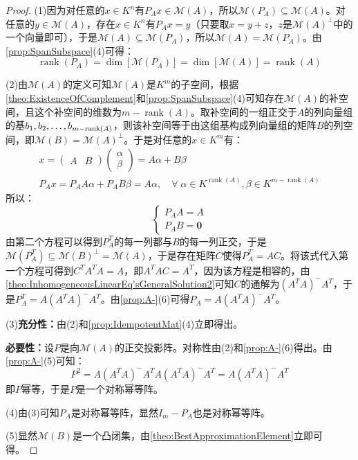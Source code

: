 \begin{proof}
	(1)因为对任意的$x\in K^n$有$P_Ax\in\mathcal{M}(A)$，所以$\mathcal{M}(P_A)\subseteq\mathcal{M}(A)$。对任意的$y\in\mathcal{M}(A)$，存在$x\in K^n$有$P_Ax=y$（只要取$x=y+z$，$z$是$\mathcal{M}(A)^\perp$中的一个向量即可），于是$\mathcal{M}(A)\subseteq\mathcal{M}(P_A)$，所以$\mathcal{M}(A)=\mathcal{M}(P_A)$。由\cref{prop:SpanSubspace}(4)可得：
	\begin{equation*}
		\operatorname{rank}(P_A)=\dim[\mathcal{M}(P_A)]=\dim[\mathcal{M}(A)]=\operatorname{rank}(A)
	\end{equation*}\par
	(2)由$\mathcal{M}(A)$的定义可知$\mathcal{M}(A)$是$K^m$的子空间，根据\cref{theo:ExistenceOfComplement}和\cref{prop:SpanSubspace}(4)可知存在$\mathcal{M}(A)$的补空间，且这个补空间的维数为$m-\operatorname{rank}(A)$。取补空间的一组正交于$A$的列向量组的基$b_1, b_2, \dots, b_{m-\operatorname{rank}(A)}$，则该补空间等于由这组基构成列向量组的矩阵$B$的列空间，即$\mathcal{M}(B)=\mathcal{M}(A)^\perp$。于是对任意的$x\in K^m$有：
	\begin{gather*}
		x=
		\begin{pmatrix}
			A & B
		\end{pmatrix}
		\begin{pmatrix}
			\alpha \\
			\beta
		\end{pmatrix}=A\alpha+B\beta \\
		P_Ax=P_AA\alpha+P_AB\beta=A\alpha,\quad\forall\;\alpha\in K^{\operatorname{rank}(A)},\beta\in K^{m-\operatorname{rank}(A)}
	\end{gather*}
	所以：
	\begin{equation*}
		\begin{cases}
			P_AA=A \\
			P_AB=\mathbf{0}
		\end{cases}
	\end{equation*}
	由第二个方程可以得到$P_A^T$的每一列都与$B$的每一列正交，于是$\mathcal{M}(P_A^T)\subseteq\mathcal{M}(B)^\perp=\mathcal{M}(A)$，于是存在矩阵$C$使得$P_A^T=AC$。将该式代入第一个方程可得到$C^TA^TA=A$，即$A^TAC=A^T$，因为该方程是相容的，由\cref{theo:InhomogeneousLinearEq'sGeneralSolution2}可知$C$的通解为$(A^TA)^-A^T$，于是$P_A^T=A(A^TA)^-A^T$。由\cref{prop:A-}(6)可得$P_A=A(A^TA)^-A^T$。\par
	(3)\textbf{充分性：}由(2)和\cref{prop:IdempotentMat}(4)立即得出。\par
	\textbf{必要性：}设$P$是向$\mathcal{M}(A)$的正交投影阵。对称性由(2)和\cref{prop:A-}(6)得出。由\cref{prop:A-}(5)可知：
	\begin{equation*}
		P^2=A(A^TA)^-A^TA(A^TA)^-A^T=A(A^TA)^-A^T
	\end{equation*}
	即$P$幂等，于是$P$是一个对称幂等阵。\par
	(4)由(3)可知$P_A$是对称幂等阵，显然$I_m-P_A$也是对称幂等阵。\par
	(5)显然$\mathcal{M}(B)$是一个凸闭集，由\cref{theo:BestApproximationElement}立即可得。\par
\end{proof}

